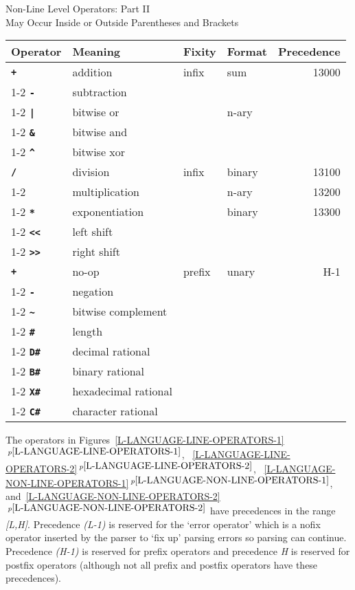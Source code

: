 \documentclass[12pt]{article}
\newcommand{\ttkey}[1]{{\tt \bfseries #1}}
\newcommand{\itemref}[1]{\ref{#1}$\,^{p\pageref{#1}}$}
\newlength{\figurewidth}
\newenvironment{boxedfigure}[1][!btp]%
	{\begin{figure*}[#1]
	 \begin{lrbox}{\figurebox}
	 \begin{minipage}{\figurewidth}

	 \vspace*{1ex}}%
	{
	 \vspace*{1ex}

	 \end{minipage}
	 \end{lrbox}

	 \centering
	 \fbox{\hspace*{0.1in}\usebox{\figurebox}\hspace*{0.1in}}
	 \end{figure*}}
\begin{document}
\begin{boxedfigure}[!t]
\begin{center}
Non-Line Level Operators: Part II \\
May Occur Inside or Outside Parentheses and Brackets
\\[1ex]
\begin{tabular}{|l|l|l|l|r|}
\hline
Operator & Meaning & Fixity & Format & Precedence \\
\hline
\ttkey{+}  & addition & infix & sum & 13000
\\\cline{1-2}
\ttkey{-}  & subtraction & & &
\\\cline{1-2}\cline{4-4}
\ttkey{|}  & bitwise or & & n-ary &
\\\cline{1-2}
\ttkey{\&}  & bitwise and & & &
\\\cline{1-2}
\ttkey{\textasciicircum}  & bitwise xor & & &
\\\hline
\ttkey{/}  & division & infix & binary & 13100
\\\cline{1-2}\cline{4-5}
\ttkey{*}  & multiplication & & n-ary & 13200
\\\cline{1-2}\cline{4-5}
\ttkey{**}  & exponentiation & & binary & 13300
\\\cline{1-2}
\ttkey{<{}<}  & left shift & & &
\\\cline{1-2}
\ttkey{>{}>}  & right shift & & &
\\\hline
\ttkey{+}  & no-op & prefix & unary & H-1
\\\cline{1-2}
\ttkey{-}  & negation & & &
\\\cline{1-2}
\ttkey{\textasciitilde}  & bitwise complement & & &
\\\cline{1-2}
\ttkey{\#}  & length & & &
\\\cline{1-2}
\ttkey{D\#}  & decimal rational & & &
\\\cline{1-2}
\ttkey{B\#}  & binary rational & & &
\\\cline{1-2}
\ttkey{X\#}  & hexadecimal rational & & &
\\\cline{1-2}
\ttkey{C\#}  & character rational & & &
\\\hline

\end{tabular}
\end{center}

\caption{L-Language Non-Line Operators}
\label{L-LANGUAGE-NON-LINE-OPERATORS-2}
\end{boxedfigure}

The operators in
Figures~\itemref{L-LANGUAGE-LINE-OPERATORS-1},
~\itemref{L-LANGUAGE-LINE-OPERATORS-2},
~\itemref{L-LANGUAGE-NON-LINE-OPERATORS-1},
and~\itemref{L-LANGUAGE-NON-LINE-OPERATORS-2}
have precedences in
the range {\em [L,H]}.
Precedence {\em (L-1)} is reserved for the `error operator' which is a
nofix operator inserted by the parser to `fix up' parsing errors
so parsing can continue.  Precedence {\em (H-1)} is reserved for prefix
operators and precedence {\em H} is reserved for postfix operators
(although not all prefix and postfix operators have these precedences).
\end{document}
